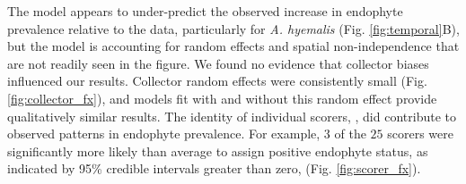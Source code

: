 \documentclass[11pt]{article}
\newcommand{\revise}[1]{{\color{black}{#1}}}
\begin{document}
The model appears to under-predict the observed increase in endophyte prevalence relative to the data, particularly for \emph{A. hyemalis} (Fig. \ref{fig:temporal}B), but the model is accounting for random effects and spatial non-independence that are not readily seen in the figure. 
We found no evidence that collector biases influenced our results. 
Collector random effects were consistently small (Fig. \ref{fig:collector_fx}), and models fit with and without this random effect provide qualitatively similar results.
The identity of individual scorers, \revise{the researchers who identified endophyte status microscopically}, did contribute to observed patterns in endophyte prevalence.
For example, $3$ of the $25$ scorers were significantly more likely than average to assign positive endophyte status, as indicated by 95\% credible intervals greater than zero, \revise{while $4$ of the $25$ had 95\% credible intervals below zero} (Fig. \ref{fig:scorer_fx}). 
\end{document}
